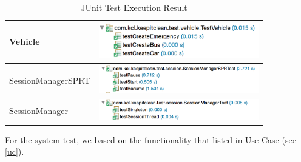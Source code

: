 \documentclass[11pt]{article}
\begin{document}
\begin{center}
\begin{table}[H]
\begin{tabular}{|m{7cm}|m{7cm}|}
		 Vehicle & \includegraphics[width=7cm]{TestVehicle}\\ \hline
		 SessionManagerSPRT & \includegraphics[width=7cm]{SessionManagerSPRTest}\\ \hline
		 SessionManager & \includegraphics[width=7cm]{SessionManagerTest}\\ \hline
		
	\end{tabular}
	\caption{JUnit Test Execution Result}
		\label{table:JUnitTestingTable}
	\end{table}
\end{center}

For the system test, we based on the functionality that listed in Use Case (see \ref{uc}).
\end{document}

